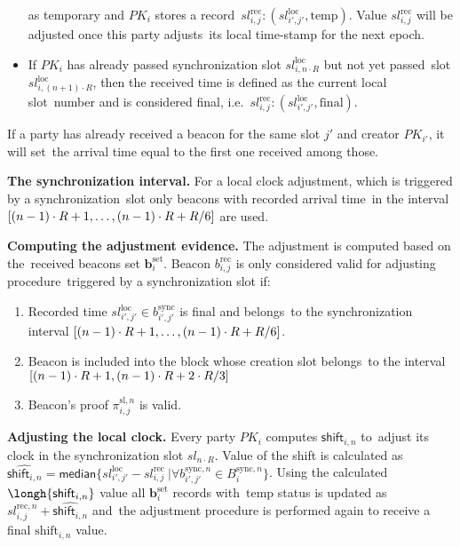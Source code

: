 \begin{legal}
\begin{itemize}
        as temporary and $PK_i$ stores a record\
        ${{sl^{\text{rec}}_{i, j}}: (sl_{i', j'}^{\text{loc}}, \text{temp})}$.
        Value ${{sl^{\text{rec}}_{i, j}}}$ will be adjusted once this party adjusts\
        its local time-stamp for the next epoch.
        \item If $PK_i$ has already passed synchronization slot $sl_{i, n \cdot R}^{\text{loc}}$ but not yet passed\
        slot $sl_{i, (n + 1) \cdot R}^{\text{loc}}$, then the received time is defined as the current local slot\
        number and is considered final, i.e.\
        ${{sl^{\text{rec}}_{i, j}}: (sl_{i', j'}^{\text{loc}}, \text{final})}$.
    \end{itemize}
    If a party has already received a beacon for the same slot $j'$ and creator $PK_{i'}$, it will set\
    the arrival time equal to the first one received among those.
    \item[]\textbf{The synchronization interval.} For a local clock adjustment, which is triggered by a synchronization\
    slot only beacons with recorded arrival time\
    in the interval ${[(n - 1) \cdot R + 1,\dots,(n-1) \cdot R + R \// 6]}$ are used.
    \item[]\textbf{Computing the adjustment evidence.} The adjustment is computed based on the\
    received beacons set $\mathbf{b}_i^{\text{set}}$.
    Beacon ${b^{\text{rec}}_{i, j}}$ is only considered valid for adjusting procedure\
    triggered by a synchronization slot if:
    \begin{enumerate}
        \item Recorded time ${sl_{i', j'}^{\text{loc}} \in b_{i', j'}^{\text{sync}}}$ is final and belongs\
        to the synchronization interval ${[(n - 1) \cdot R + 1,\dots,(n-1) \cdot R + R \// 6]}$.
        \item Beacon is included into the block whose creation slot belongs\
        to the interval ${[(n - 1) \cdot R + 1, (n - 1) \cdot R + 2 \cdot R \// 3]}$
        \item Beacon's proof $\pi_{i, j}^{\text{sl}, n}$ is valid.
    \end{enumerate}
    \item[]\textbf{Adjusting the local clock.} Every party $PK_i$ computes $\textsf{shift}_{i, n}$ to\
    adjust its clock in the synchronization slot $sl_{n \cdot R}$.
    Value of the shift is calculated as\
    ${\hat{\textsf{shift}_{i, n}} = \textsf{median} \{sl_{i', j'}^{\text{loc}} - sl^{\text{rec}}_{i, j}\
    | \forall b_{i', j'}^{\text{sync}, n} \in B_i^{\text{sync}, n}\}}$.
    Using the calculated ${\longh{\textsf{shift}_{i, n}}}$ value all $\mathbf{b}_i^{\text{set}}$ records with\
    $\text{temp}$ status is updated as ${sl^{\text{rec}, n}_{i, j} + \hat{\textsf{shift}_{i, n}}}$ and\
    the adjustment procedure is performed again to receive a final $\text{shift}_{i, n}$ value.
\end{legal}


